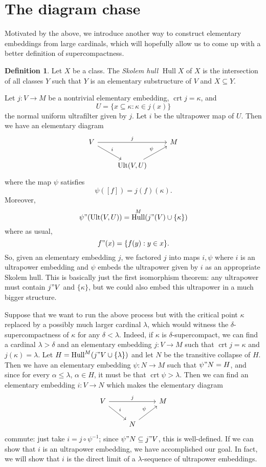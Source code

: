 \documentclass[12pt]{report}
\DeclareMathOperator{\Hull}{Hull}
\DeclareMathOperator{\crt}{crt}
\DeclareMathOperator{\Ult}{Ult}
\newcommand{\dfn}[1]{\emph{#1}\index{#1}}
\theoremstyle{definition}
\newtheorem{definition}[theorem]{Definition}
\begin{document}
\section{The diagram chase}
Motivated by the above, we introduce another way to construct elementary embeddings from large cardinals, which will hopefully allow us to come up with a better definition of supercompactness.

\begin{definition}
Let $X$ be a class. The \dfn{Skolem hull} $\Hull X$ of $X$ is the intersection of all classes $Y$ such that $Y$ is an elementary substructure of $V$ and $X \subseteq Y$.
\end{definition}

Let $j: V \to M$ be a nontrivial elementary embedding, $\crt j = \kappa$, and
$$U = \{x \subseteq \kappa: \kappa \in j(x)\}$$
the normal uniform ultrafilter given by $j$. Let $i$ be the ultrapower map of $U$. Then we have an elementary diagram
$$\begin{tikzcd}V \arrow[rr, "j"] \arrow[dr, "i"]&& M\\
&\Ult(V, U)\arrow[ur, "\psi"]\end{tikzcd}$$
where the map $\psi$ satisfies
$$\psi([f]) = j(f)(\kappa).$$
Moreover,
$$\psi"(\Ult(V, U)) = \Hull^M(j"(V) \cup \{\kappa\})$$
where as usual,
$$f"(x) = \{f(y): y \in x\}.$$
So, given an elementary embedding $j$, we factored $j$ into maps $i,\psi$ where $i$ is an ultrapower embedding and $\psi$ embeds the ultrapower given by $i$ as an appropriate Skolem hull.
This is basically just the first isomorphism theorem: any ultrapower must contain $j"V$ and $\{\kappa\}$, but we could also embed this ultrapower in a much bigger structure.

Suppose that we want to run the above process but with the critical point $\kappa$ replaced by a possibly much larger cardinal $\lambda$, which would witness the $\delta$-supercompactness of $\kappa$ for any $\delta < \lambda$.
Indeed, if $\kappa$ is $\delta$-supercompact, we can find a cardinal $\lambda > \delta$ and an elementary embedding $j: V \to M$ such that $\crt j = \kappa$ and $j(\kappa) = \lambda$. Let $H = \Hull^M(j"V \cup \{\lambda\})$ and let $N$ be the transitive collapse of $H$.
Then we have an elementary embedding $\psi: N \to M$ such that $\psi"N = H$, and since for every $\alpha \leq \lambda$, $\alpha \in H$, it must be that $\crt \psi > \lambda$.
Then we can find an elementary embedding $i: V \to N$ which makes the elementary diagram
$$\begin{tikzcd}V \arrow[rr, "j"] \arrow[dr, "i"]&& M\\
&N\arrow[ur, "\psi"]\end{tikzcd}$$
commute: just take $i = j \circ \psi^{-1}$; since $\psi"N \subseteq j"V$, this is well-defined.
If we can show that $i$ is an ultrapower embedding, we have accomplished our goal.
In fact, we will show that $i$ is the direct limit of a $\lambda$-sequence of ultrapower embeddings.
\end{document}
